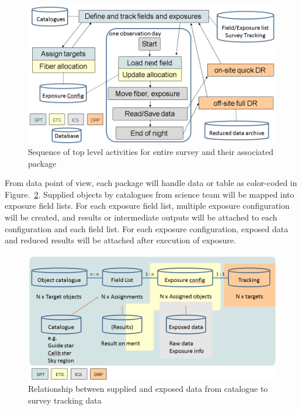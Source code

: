 \documentclass[a4paper,notitlepage]{article}
\begin{document}
\begin{figure}[htb]
  \begin{center}
    \includegraphics[width=.75\linewidth]{sciops-scireq-slide-softcoord.png}
  \end{center}
  \caption{Sequence of top level activities for entire survey and 
    their associated package}
  \label{fig:sciops-scireq-slide-softcoord}
\end{figure}

From data point of view, each package will handle data or table as
color-coded in Figure.~\ref{fig:sciops-scireq-slide-data}. Supplied
objects by catalogues from science team will be mapped into exposure
field lists. For each exposure field list, multiple exposure
configuration will be created, and results or intermediate outputs will
be attached to each configuration and each field list.  For each
exposure configuration, exposed data and reduced results will be
attached after execution of exposure.

\begin{figure}[htb]
  \begin{center}
    \includegraphics[width=.75\linewidth]{sciops-scireq-slide-data.png}
  \end{center}
  \caption{Relationship between supplied and exposed data from catalogue
    to survey tracking data} \label{fig:sciops-scireq-slide-data}
\end{figure}


\clearpage
\end{document}
